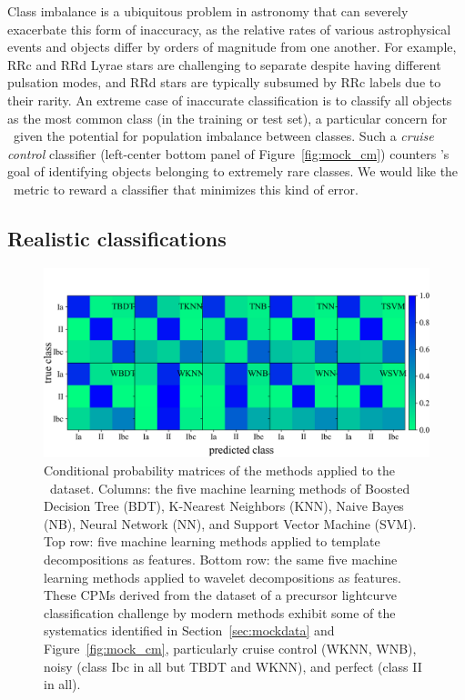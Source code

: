 Class imbalance is a ubiquitous problem in astronomy that can severely exacerbate this form of inaccuracy, as the relative rates of various astrophysical events and objects differ by orders of magnitude from one another.
For example, RRc and RRd Lyrae stars are challenging to separate despite having different pulsation modes, and RRd stars are typically subsumed by RRc labels due to their rarity.
An extreme case of inaccurate classification is to classify all objects as the most common class (in the training or test set), a particular concern for \plasticc\ given the potential for population imbalance between classes.
Such a \textit{cruise control} classifier (left-center bottom panel of Figure~\ref{fig:mock_cm}) counters \plasticc's goal of identifying objects belonging to extremely rare classes.
We would like the \plasticc\ metric to reward a classifier that minimizes this kind of error.

\subsection{Realistic classifications}
\label{sec:realdata}

\begin{figure}
	\begin{center}
    \includegraphics[width=\textwidth]{./fig/all_snphotcc_cm.png}
		\caption{Conditional probability matrices of the \citet{lochner_photometric_2016} methods applied to the \snphotcc\ dataset.
		Columns: the five machine learning methods of Boosted Decision Tree (BDT), K-Nearest Neighbors (KNN), Naive Bayes (NB), Neural Network (NN), and Support Vector Machine (SVM).
    Top row: five machine learning methods applied to template decompositions as features.
    Bottom row: the same five machine learning methods applied to wavelet decompositions as features.
		These CPMs derived from the dataset of a precursor lightcurve classification challenge by modern methods exhibit some of the systematics identified in Section~\ref{sec:mockdata} and Figure~\ref{fig:mock_cm}, particularly cruise control (WKNN, WNB), noisy (class Ibc in all but TBDT and WKNN), and perfect (class II in all).
		}
		\label{fig:snphotcc_cm}
	\end{center}
\end{figure}

